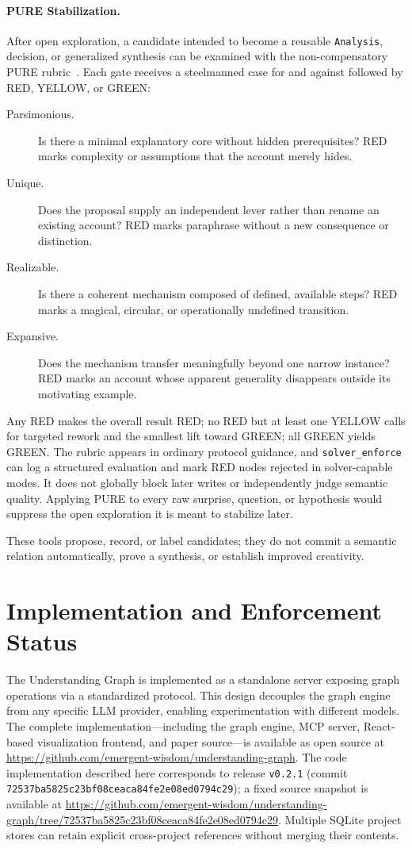 \paragraph{PURE Stabilization.}
After open exploration, a candidate intended to become a reusable \texttt{Analysis}, decision, or generalized synthesis can be examined with the non-compensatory PURE rubric~\cite{westerberg2026ri}. Each gate receives a steelmanned case for and against followed by RED, YELLOW, or GREEN:
\begin{description}
    \item[Parsimonious.] Is there a minimal explanatory core without hidden prerequisites? RED marks complexity or assumptions that the account merely hides.
    \item[Unique.] Does the proposal supply an independent lever rather than rename an existing account? RED marks paraphrase without a new consequence or distinction.
    \item[Realizable.] Is there a coherent mechanism composed of defined, available steps? RED marks a magical, circular, or operationally undefined transition.
    \item[Expansive.] Does the mechanism transfer meaningfully beyond one narrow instance? RED marks an account whose apparent generality disappears outside its motivating example.
\end{description}
Any RED makes the overall result RED; no RED but at least one YELLOW calls for targeted rework and the smallest lift toward GREEN; all GREEN yields GREEN. The rubric appears in ordinary protocol guidance, and \texttt{solver\_enforce} can log a structured evaluation and mark RED nodes rejected in solver-capable modes. It does not globally block later writes or independently judge semantic quality. Applying PURE to every raw surprise, question, or hypothesis would suppress the open exploration it is meant to stabilize later.

These tools propose, record, or label candidates; they do not commit a semantic relation automatically, prove a synthesis, or establish improved creativity.

\section{Implementation and Enforcement Status}
\label{sec:implementation}

The Understanding Graph is implemented as a standalone server exposing graph operations via a standardized protocol. This design decouples the graph engine from any specific LLM provider, enabling experimentation with different models. The complete implementation---including the graph engine, MCP server, React-based visualization frontend, and paper source---is available as open source at \url{https://github.com/emergent-wisdom/understanding-graph}. The code implementation described here corresponds to release \texttt{v0.2.1} (commit \texttt{72537ba5825c23bf08ceaca84fe2e08ed0794c29}); a fixed source snapshot is available at \url{https://github.com/emergent-wisdom/understanding-graph/tree/72537ba5825c23bf08ceaca84fe2e08ed0794c29}. Multiple SQLite project stores can retain explicit cross-project references without merging their contents.

